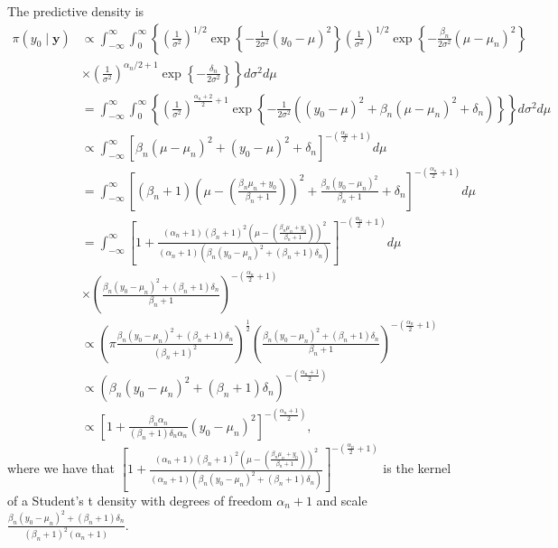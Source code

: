 \begin{enumerate}
The predictive density is
{\footnotesize{
\begin{align}
	\pi(y_0\mid \bm{y})&\propto\int_{-\infty}^{\infty}\int_0^{\infty}\left\{ \left(\frac{1}{\sigma^2}\right)^{1/2}\exp\left\{-\frac{1}{2\sigma^2}(y_0-\mu)^2\right\}\left(\frac{1}{\sigma^2}\right)^{1/2}\exp\left\{-\frac{\beta_n}{2\sigma^2}(\mu-\mu_n)^2\right\}\right.\nonumber\\
	&\times \left.\left(\frac{1}{\sigma^2}\right)^{\alpha_n/2+1}\exp\left\{-\frac{\delta_n}{2\sigma^2}\right\}\right\}d\sigma^2d\mu\nonumber\\
	&=\int_{-\infty}^{\infty}\int_0^{\infty}\left\{ \left(\frac{1}{\sigma^2}\right)^{\frac{\alpha_n+2}{2}+1}\exp\left\{-\frac{1}{2\sigma^2}((y_0-\mu)^2+\beta_n(\mu-\mu_n)^2+\delta_n)\right\}\right\}d\sigma^2d\mu\nonumber\\
	&\propto\int_{-\infty}^{\infty}\left[\beta_n(\mu-\mu_n)^2+(y_0-\mu)^2+\delta_n\right]^{-\left(\frac{\alpha_n}{2}+1\right)}d\mu\nonumber\\
	&=\int_{-\infty}^{\infty}\left[(\beta_n+1)\left(\mu-\left(\frac{\beta_n\mu_n+y_0}{\beta_n+1}\right)\right)^2+\frac{\beta_n(y_0-\mu_n)^2}{\beta_n+1}+\delta_n\right]^{-\left(\frac{\alpha_n}{2}+1\right)}d\mu\nonumber\\
	&=\int_{-\infty}^{\infty}\left[1+\frac{(\alpha_n+1)(\beta_n+1)^2\left(\mu-\left(\frac{\beta_n\mu_n+y_0}{\beta_n+1}\right)\right)^2}{(\alpha_n+1)(\beta_n(y_0-\mu_n)^2+(\beta_n+1)\delta_n)}\right]^{-\left(\frac{\alpha_n}{2}+1\right)}d\mu\nonumber\\
	&\times\left(\frac{\beta_n(y_0-\mu_n)^2+(\beta_n+1)\delta_n}{\beta_n+1}\right)^{-\left(\frac{\alpha_n}{2}+1\right)}\nonumber\\
	&\propto\left(\pi\frac{\beta_n(y_0-\mu_n)^2+(\beta_n+1)\delta_n}{(\beta_n+1)^2}\right)^{\frac{1}{2}}\left(\frac{\beta_n(y_0-\mu_n)^2+(\beta_n+1)\delta_n}{\beta_n+1}\right)^{-\left(\frac{\alpha_n}{2}+1\right)}\nonumber\\
	&\propto (\beta_n(y_0-\mu_n)^2+(\beta_n+1)\delta_n)^{-\left(\frac{\alpha_n+1}{2}\right)}\nonumber\\
	&\propto\left[1+\frac{\beta_n\alpha_n}{(\beta_n+1)\delta_n\alpha_n}(y_0-\mu_n)^2\right]^{-\left(\frac{\alpha_n+1}{2}\right)},\nonumber
\end{align}
}}
where we have that $\left[1+\frac{(\alpha_n+1)(\beta_n+1)^2\left(\mu-\left(\frac{\beta_n\mu_n+y_0}{\beta_n+1}\right)\right)^2}{(\alpha_n+1)(\beta_n(y_0-\mu_n)^2+(\beta_n+1)\delta_n)}\right]^{-\left(\frac{\alpha_n}{2}+1\right)}$ is the kernel of a Student's t density with degrees of freedom $\alpha_n+1$ and scale $\frac{\beta_n(y_0-\mu_n)^2+(\beta_n+1)\delta_n}{(\beta_n+1)^2(\alpha_n+1)}$. 


\end{enumerate}
